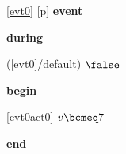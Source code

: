 \noindent \ref{evt0} [p] \textbf{event}
\begin{block}
  \item   \textbf{during}
  \begin{block}
  \item[ (\ref{evt0}/default) ]{$\false $} %
  \end{block}
  \item   \textbf{begin}
  \begin{block}
  \item[ \eqref{evt0act0} ]{$v \bcmeq 7$} %
  \end{block}
  \item   \textbf{end} \\
\end{block}
